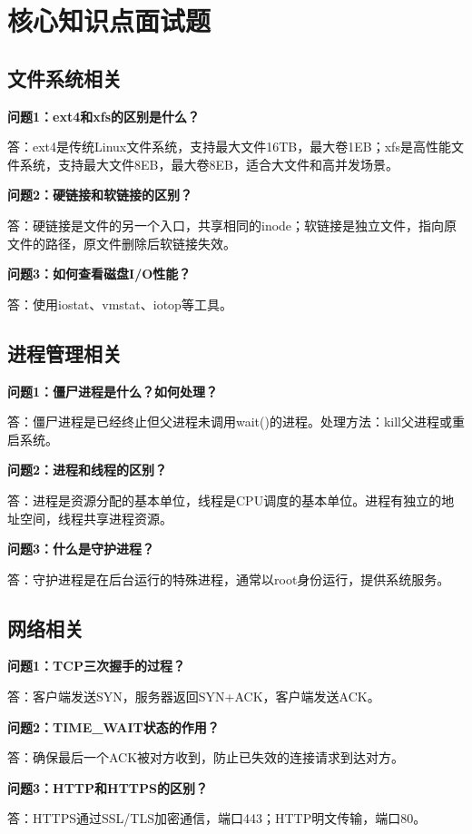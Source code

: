 \documentclass[12pt,UTF8]{ctexbook}
\begin{document}
\section{核心知识点面试题}
\label{sec:interview-questions}

\subsection*{文件系统相关}
\textbf{问题1：ext4和xfs的区别是什么？}

答：ext4是传统Linux文件系统，支持最大文件16TB，最大卷1EB；xfs是高性能文件系统，支持最大文件8EB，最大卷8EB，适合大文件和高并发场景。

\textbf{问题2：硬链接和软链接的区别？}

答：硬链接是文件的另一个入口，共享相同的inode；软链接是独立文件，指向原文件的路径，原文件删除后软链接失效。

\textbf{问题3：如何查看磁盘I/O性能？}

答：使用iostat、vmstat、iotop等工具。

\subsection*{进程管理相关}
\textbf{问题1：僵尸进程是什么？如何处理？}

答：僵尸进程是已经终止但父进程未调用wait()的进程。处理方法：kill父进程或重启系统。

\textbf{问题2：进程和线程的区别？}

答：进程是资源分配的基本单位，线程是CPU调度的基本单位。进程有独立的地址空间，线程共享进程资源。

\textbf{问题3：什么是守护进程？}

答：守护进程是在后台运行的特殊进程，通常以root身份运行，提供系统服务。

\subsection*{网络相关}
\textbf{问题1：TCP三次握手的过程？}

答：客户端发送SYN，服务器返回SYN+ACK，客户端发送ACK。

\textbf{问题2：TIME\_WAIT状态的作用？}

答：确保最后一个ACK被对方收到，防止已失效的连接请求到达对方。

\textbf{问题3：HTTP和HTTPS的区别？}

答：HTTPS通过SSL/TLS加密通信，端口443；HTTP明文传输，端口80。
\end{document}
